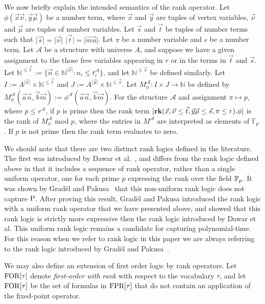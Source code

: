 \documentclass[../paper.tex]{subfiles}
\begin{document}
We now briefly explain the intended semantics of the rank operator. Let $\phi
(\vec{x} \vec {\nu}, \vec{y}\vec{\mu})$ be a number term, where $\vec{x}$ and
$\vec{y}$ are tuples of vertex variables, $\vec{\nu}$ and $\vec{\mu}$ are tuples
of number variables. Let $\vec{s}$ and $\vec{t}$ be tuples of number terms such
that $\vert \vec{s} \vert = \vert \vec{\nu} \vert$ $\vert \vec{t}\vert = \vert
\vec{mu} \vert$. Let $\pi$ be a number variable and $r$ be a number term. Let
$\mathcal{A}$ be a structure with universe $A$, and suppose we have a given
assignment to the those free variables appearing in $r$ or in the terms in
$\vec{t}$ and $\vec{s}$. Let $\mathbb{N}^{\leq\vec{t}} := \{\vec{n} \in
\mathbb{N}^{\vert \vec{\nu} \vert}: n_i \leq t^{\mathcal{A}}_i\}$, and let
$\mathbb{N}^{\leq \vec{s}}$ be defined similarly. Let $I:= A^{\vert \vec{x}
  \vert} \times \mathbb{N}^{\leq \vec{t}}$ and $J := A^{\vert \vec{y} \vert}
\times \mathbb{N}^{\leq \vec{s}}$. Let $M^{\mathcal{A}}_\phi : I \times J
\rightarrow \mathbb{N}$ be defined by $M^{\mathcal{A}}_\phi (\vec{a}\vec{n},
\vec{b}\vec{m}):= \phi^{\mathcal{A}}(\vec{a}\vec{n},\vec{b}\vec{m})$. For the
structure $\mathcal{A}$ and assignment $\pi \mapsto p$, where $p \leq
r^{\mathcal{A}}$, if $p$ is prime then the rank term $[\text{\textbf{rk}} (\vec{x}, \vec
{\nu} \leq \vec{t}, \vec{y}\vec{\mu} \leq \vec{s}, \pi \leq r). \phi]$ is the
rank of $M^{\mathcal{A}}_\phi$ mod $p$, where the entries in $M^{\mathcal{A}}$
are interpreted as elements of $\mathbb{F}_p$. If $p$ is not prime then the rank
term evaluates to zero.

We should note that there are two distinct rank logics defined in the
literature. The first was introduced by Dawar et al.~\cite{Dawar09logicswith},
and differs from the rank logic defined above in that it includes a sequence of
rank operator, rather than a single uniform operator, one for each prime $p$
expressing the rank over the field $\mathbb{F}_p$. It was shown by Grad{\"e}l and
Pakusa~\cite{GradelP15a} that this non-uniform rank logic does not capture
$\mathrm{P}$. After proving this result, Grad{\"e}l and Pakusa introduced the rank
logic with a uniform rank operator that we have presented above, and showed that
this rank logic is strictly more expressive then the rank logic introduced by
Dawar et al. This uniform rank logic remains a candidate for capturing
polynomial-time. For this reason when we refer to rank logic in this paper we
are always referring to the rank logic introduced by Grad{\"e}l and
Pakusa~\cite{GradelP15a}.

We may also define an extension of first order logic by rank operators. Let
$\text{\upshape FOR}[\tau]$ denote \emph{first-order with rank} with respect to the vocabulary
$\tau$, and let $\text{\upshape FOR}[\tau]$ be the set of formulas in $\text{\upshape FPR}[\tau]$ that do not
contain an application of the fixed-point operator.
\end{document}
